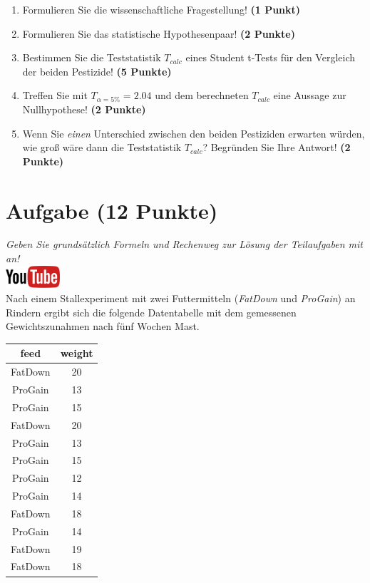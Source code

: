 \documentclass[a4paper, 9pt]{scrartcl}\usepackage[]{graphicx}\usepackage[]{xcolor}
\begin{document}
\begin{enumerate}
  \item Formulieren Sie die wissenschaftliche Fragestellung! \textbf{(1 Punkt)}
  \item Formulieren Sie das statistische Hypothesenpaar! \textbf{(2
      Punkte)}
  \item Bestimmen Sie die Teststatistik $T_{calc}$ eines Student t-Tests f{\"u}r den
  Vergleich der beiden Pestizide! \textbf{(5 Punkte)}
\item Treffen Sie mit $T_{\alpha = 5\%} = 2.04$ und dem berechneten $T_{calc}$ eine Aussage
  zur Nullhypothese! \textbf{(2 Punkte)}
\item Wenn Sie \textit{einen} Unterschied zwischen den beiden
  Pestiziden erwarten w{\"u}rden, wie gro{\ss} w{\"a}re dann die Teststatistik
  $T_{calc}$? Begr{\"u}nden Sie Ihre Antwort! \textbf{(2 Punkte)}
\end{enumerate} 
\clearpage

\section{Aufgabe \hfill (12 Punkte)}

\textit{Geben Sie grunds{\"a}tzlich Formeln und Rechenweg zur L{\"o}sung der
  Teilaufgaben mit an!} \\[1Ex]

\hfill\href{https://youtu.be/TbSEOMCQYl4}{\includegraphics[width =
  2cm]{img/youtube}}\\[1Ex]



Nach einem Stallexperiment mit zwei Futtermitteln (\textit{FatDown} und
\textit{ProGain}) an Rindern ergibt sich die folgende Datentabelle
mit dem gemessenen Gewichtszunahmen nach f{\"u}nf Wochen Mast.

\begin{table}[!h]
\centering
\begin{tabular}{cc}
\toprule
feed & weight\\
\midrule
FatDown & 20\\
ProGain & 13\\
ProGain & 15\\
FatDown & 20\\
ProGain & 13\\
\addlinespace
ProGain & 15\\
ProGain & 12\\
ProGain & 14\\
FatDown & 18\\
ProGain & 14\\
\addlinespace
FatDown & 19\\
FatDown & 18\\
\bottomrule
\end{tabular}
\end{table}
\end{document}
